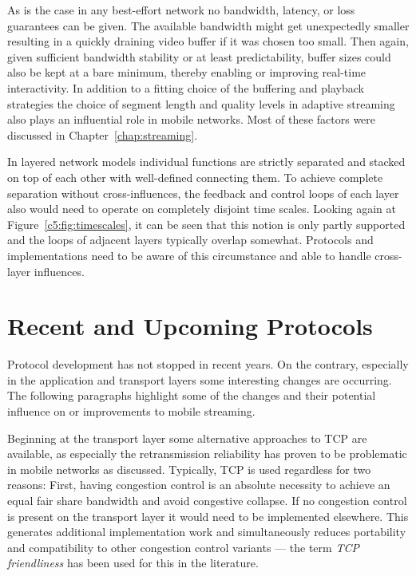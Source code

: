 As is the case in any best-effort network no bandwidth, latency, or loss guarantees can be given. The available bandwidth might get unexpectedly smaller resulting in a quickly draining video buffer if it was chosen too small. Then again, given sufficient bandwidth stability or at least predictability, buffer sizes could also be kept at a bare minimum, thereby enabling or improving real-time interactivity. In addition to a fitting choice of the buffering and playback strategies the choice of segment length and quality levels in adaptive streaming also plays an influential role in mobile networks. Most of these factors were discussed in Chapter~\ref{chap:streaming}.

In layered network models individual functions are strictly separated and stacked on top of each other with well-defined  connecting them. To achieve complete separation without cross-influences, the feedback and control loops of each layer also would need to operate on completely disjoint time scales. Looking again at Figure~\ref{c5:fig:timescales}, it can be seen that this notion is only partly supported and the loops of adjacent layers typically overlap somewhat. Protocols and implementations need to be aware of this circumstance and able to handle cross-layer influences.


\section{Recent and Upcoming Protocols}

Protocol development has not stopped in recent years. On the contrary, especially in the application and transport layers some interesting changes are occurring. The following paragraphs highlight some of the changes and their potential influence on or improvements to mobile streaming.

Beginning at the transport layer some alternative approaches to \gls{TCP} are available, as especially the retransmission reliability has proven to be problematic in mobile networks as discussed. Typically, \gls{TCP} is used regardless for two reasons: First, having congestion control is an absolute necessity to achieve an equal fair share bandwidth and avoid congestive collapse. If no congestion control is present on the transport layer it would need to be implemented elsewhere. This generates additional implementation work and simultaneously reduces portability and compatibility to other congestion control variants --- the term \textit{TCP friendliness} has been used for this in the literature. 

